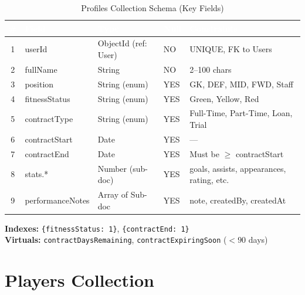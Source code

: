 \documentclass[12pt,a4paper,oneside]{report}
\begin{document}
\begin{table}[H]
\centering
\caption{Profiles Collection Schema (Key Fields)}
\label{tab:profiles}
\small
\begin{tabularx}{\textwidth}{|c|l|l|l|X|}
\hline
\rowcolor{tableHeader}
\textcolor{white}{\#} & \textcolor{white}{\textbf{Field}} & \textcolor{white}{\textbf{Type}} & \textcolor{white}{\textbf{Null}} & \textcolor{white}{\textbf{Constraints}} \\
\hline
1 & userId            & ObjectId (ref: User)  & NO  & UNIQUE, FK to Users \\
\hline\rowcolor{tableRow}
2 & fullName          & String                & NO  & 2--100 chars \\
\hline
3 & position          & String (enum)         & YES & GK, DEF, MID, FWD, Staff \\
\hline\rowcolor{tableRow}
4 & fitnessStatus     & String (enum)         & YES & Green, Yellow, Red \\
\hline
5 & contractType      & String (enum)         & YES & Full-Time, Part-Time, Loan, Trial \\
\hline\rowcolor{tableRow}
6 & contractStart     & Date                  & YES & --- \\
\hline
7 & contractEnd       & Date                  & YES & Must be $\geq$ contractStart \\
\hline\rowcolor{tableRow}
8 & stats.*           & Number (sub-doc)      & YES & goals, assists, appearances, rating, etc. \\
\hline
9 & performanceNotes  & Array of Sub-doc      & YES & note, createdBy, createdAt \\
\hline
\end{tabularx}
\end{table}

\noindent\textbf{Indexes:} \texttt{\{fitnessStatus: 1\}}, \texttt{\{contractEnd: 1\}}\\
\textbf{Virtuals:} \texttt{contractDaysRemaining}, \texttt{contractExpiringSoon} ($<90$ days)

\section{Players Collection}
\end{document}
